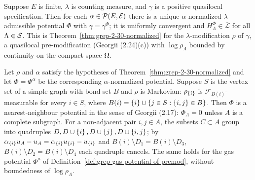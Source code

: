 \begin{corollary}[Georgii (2.31)]
    \label{cor:grep-2-31}
    \leanok

    Suppose $E$ is finite, $\lambda$ is counting measure, and $\gamma$ is a positive quasilocal
    specification.  Then for each $\alpha \in \mathcal{P}(E,\mathcal{E})$ there is a unique
    $\alpha$-normalized $\lambda$-admissible potential $\Phi$ with $\gamma = \gamma^\Phi$; it is
    uniformly convergent and $H^\Phi_\Lambda \in \overline{\mathcal{L}}$ for all $\Lambda \in \mathcal{S}$.
    This is Theorem~\ref{thm:grep-2-30-normalized} for the $\lambda$-modification $\rho$ of
    $\gamma$, a quasilocal pre-modification (Georgii (2.24)(c)) with $\log \rho_\Lambda$ bounded
    by continuity on the compact space $\Omega$.
\end{corollary}

\begin{corollary}[Georgii (2.32)]
    \label{cor:grep-2-32}
    \leanok

    Let $\rho$ and $\alpha$ satisfy the hypotheses of Theorem~\ref{thm:grep-2-30-normalized} and
    let $\Phi = \Phi^\alpha$ be the corresponding $\alpha$-normalized potential.  Suppose $S$ is
    the vertex set of a simple graph with bond set $B$ and $\rho$ is Markovian: $\rho_{\left\{ i \right\}}$ is
    $\mathcal{F}_{B(i)}$-measurable for every $i \in S$, where
    $B(i) = \left\{ i \right\} \cup \left\{ j \in S : \left\{ i,j \right\} \in B \right\}$.  Then $\Phi$ is a nearest-neighbour
    potential in the sense of Georgii (2.17): $\Phi_A = 0$ unless $A$ is a complete subgraph.
    For a non-adjacent pair $i,j \in A$, the subsets $C \subset A$ group into quadruples
    $D, D \cup \left\{ i \right\}, D \cup \left\{ j \right\}, D \cup \left\{ i,j \right\}$; by
    $\alpha_{\left\{ i \right\}}u_A - u_A = \alpha_{\left\{ i \right\}}u_{\left\{ i \right\}} - u_{\left\{ i \right\}}$ and
    $B(i) \setminus D_1 = B(i) \setminus D_3$, $B(i) \setminus D_2 = B(i)\setminus D_4$ each
    quadruple cancels.  The same holds for the gas potential $\Phi^a$ of
    Definition~\ref{def:grep-gas-potential-of-premod}, without boundedness of $\log\rho_\Lambda$.
\end{corollary}

